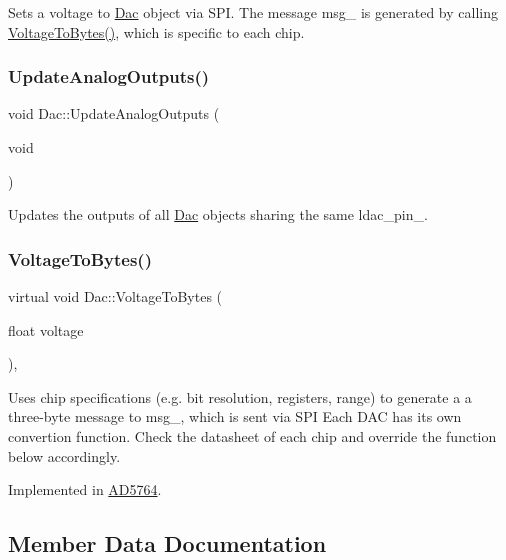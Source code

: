 Sets a voltage to \mbox{\hyperlink{classDac}{Dac}} object via S\+PI. The message msg\+\_\+ is generated by calling \mbox{\hyperlink{classDac_ac21022b2b921437418004af9ae7de8ae}{Voltage\+To\+Bytes()}}, which is specific to each chip. \mbox{\label{classDac_aafef1707ec33a2166a69e9b646cd471b}} 
\subsubsection{\texorpdfstring{Update\+Analog\+Outputs()}{UpdateAnalogOutputs()}}
{\footnotesize\ttfamily void Dac\+::\+Update\+Analog\+Outputs (\begin{DoxyParamCaption}\item[{void}]{ }\end{DoxyParamCaption})}

Updates the outputs of all \mbox{\hyperlink{classDac}{Dac}} objects sharing the same ldac\+\_\+pin\+\_\+. \mbox{\label{classDac_ac21022b2b921437418004af9ae7de8ae}} 
\subsubsection{\texorpdfstring{Voltage\+To\+Bytes()}{VoltageToBytes()}}
{\footnotesize\ttfamily virtual void Dac\+::\+Voltage\+To\+Bytes (\begin{DoxyParamCaption}\item[{float}]{voltage }\end{DoxyParamCaption})\hspace{0.3cm}{\ttfamily [protected]}, {}}

Uses chip specifications (e.\+g. bit resolution, registers, range) to generate a a three-\/byte message to msg\+\_\+, which is sent via S\+PI Each D\+AC has its own convertion function. Check the datasheet of each chip and override the function below accordingly. 

Implemented in \mbox{\hyperlink{classAD5764_aae10d34276fdfcb3542e39bccd2f20f6}{A\+D5764}}.



\subsection{Member Data Documentation}
\mbox{\label{classDac_af3de0bf669183e66ebf916f8c685fe6b}} 
